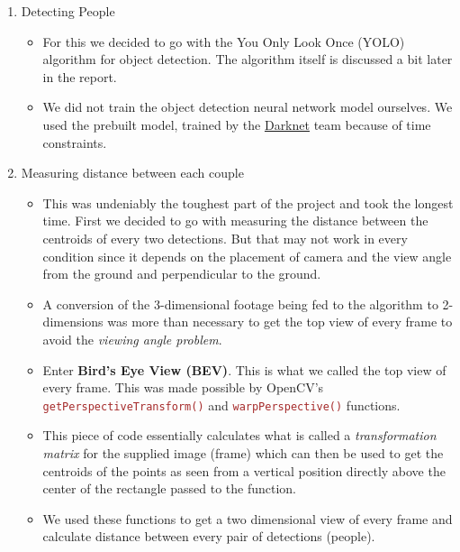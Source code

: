 \documentclass[a4paper]{article}
\begin{document}
\begin{enumerate}
    \item Detecting People
          \begin{itemize}
              \item For this we decided to go with the You Only Look Once (YOLO) algorithm for object detection. The algorithm itself is discussed a bit later in the report.
              \item We did not train the object detection neural network model ourselves. We used the prebuilt model, trained by the \href{https://pjreddie.com/darknet/yolo/}{Darknet} team because of time constraints.
              
          \end{itemize}

    \item Measuring distance between each couple
          \begin{itemize}
              \item This was undeniably the toughest part of the project and took the longest time. First we decided to go with measuring the distance between the centroids of every two detections. But that may not work in every condition since it depends on the placement of camera and the view angle from the ground and perpendicular to the ground.
              \item A conversion of the 3-dimensional footage being fed to the algorithm to 2-dimensions was more than necessary to get the top view of every frame to avoid the \textit{viewing angle problem}.
              \pagebreak
              \item Enter \textbf{Bird's Eye View (BEV)}. This is what we called the top view of every frame. This was made possible by OpenCV's \textcolor{brown}{\texttt{getPerspectiveTransform()}} and \textcolor{brown}{\texttt{warpPerspective()}} functions.
                    
              \item This piece of code essentially calculates what is called a \textit{transformation matrix}\cite{kriegman2007homography} for the supplied image (frame) which can then be used to get the centroids of the points as seen from a vertical position directly above the center of the rectangle passed to the function.
                    
              \item We used these functions to get a two dimensional view of every frame and calculate distance between every pair of detections (people).
          \end{itemize}


\end{enumerate}
\end{document}
